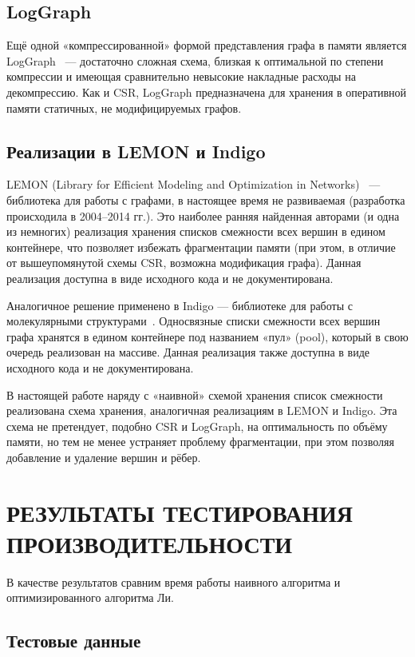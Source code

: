 \documentclass[intlimits,twoside,a4paper,11pt]{article}
\theoremstyle{definition}
\begin{document}
\subsection{LogGraph}

Ещё одной «компрессированной» формой представления графа в памяти
является LogGraph~\cite{LogGraph} — достаточно сложная схема,
близкая к оптимальной по степени компрессии и имеющая сравнительно
невысокие накладные расходы на декомпрессию. Как и CSR, LogGraph
предназначена для хранения в оперативной памяти статичных, не
модифицируемых графов.

\subsection{Реализации в LEMON и Indigo}

LEMON (Library for Efficient Modeling and Optimization in Networks)~\cite{LEMON}
--- библиотека для работы с графами, в настоящее время не развиваемая
(разработка происходила в 2004--2014 гг.). Это наиболее ранняя
найденная авторами (и одна из немногих) реализация хранения списков
смежности всех вершин в едином контейнере, что позволяет избежать
фрагментации памяти (при этом, в отличие от вышеупомянутой схемы CSR,
возможна модификация графа).
Данная реализация доступна в виде исходного кода и не документирована.

Аналогичное решение применено в Indigo — библиотеке для работы с
молекулярными структурами~\cite{Indigo,IndigoGithub}. Односвязные списки смежности всех вершин
графа хранятся в едином контейнере под названием «пул» (pool), который
в свою очередь реализован на массиве. Данная реализация также доступна в
виде исходного кода и не документирована.

В настоящей работе наряду с «наивной» схемой хранения список смежности
реализована схема хранения, аналогичная реализациям в LEMON и Indigo.
Эта схема не претендует, подобно CSR и LogGraph, на оптимальность
по объёму памяти, но тем не менее устраняет проблему фрагментации,
при этом позволяя добавление и удаление вершин и рёбер.

\section{РЕЗУЛЬТАТЫ ТЕСТИРОВАНИЯ ПРОИЗВОДИТЕЛЬНОСТИ}

В качестве результатов сравним время работы наивного алгоритма и оптимизированного алгоритма Ли.

\subsection{Тестовые данные}
\end{document}
